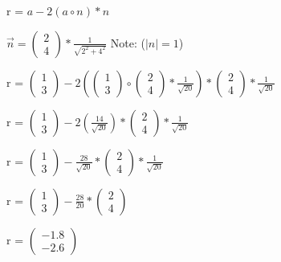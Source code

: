 r = $ a - 2 (a \circ n) * n $

$
\vec{n}
=
\left(\begin{array}{c} 2 \\ 4 \end{array}\right) * \frac{1}{\sqrt{2^2 + 4^2}}
$ Note: ($|n| = 1$)

r = $
\left(\begin{array}{c}1\\3\end{array}\right)
-
2
\left(
    \left(\begin{array}{c}1\\3\end{array}\right)
    \circ
    \left(\begin{array}{c} 2 \\ 4 \end{array}\right) * \frac{1}{\sqrt{20}}
\right)
*
\left(\begin{array}{c} 2 \\ 4 \end{array}\right) * \frac{1}{\sqrt{20}}
$

r = $
\left(\begin{array}{c}1\\3\end{array}\right)
-
2
\left(
    \frac{14}{\sqrt{20}}
\right)
*
\left(\begin{array}{c} 2 \\ 4 \end{array}\right) * \frac{1}{\sqrt{20}}
$

r = $
\left(\begin{array}{c}1\\3\end{array}\right)
-
\frac{28}{\sqrt{20}}
*
\left(\begin{array}{c} 2 \\ 4 \end{array}\right) * \frac{1}{\sqrt{20}}
$

r = $
\left(\begin{array}{c}1\\3\end{array}\right)
-
\frac{28}{20}
*
\left(\begin{array}{c} 2 \\ 4 \end{array}\right)
$

r = $
\left(\begin{array}{c}-1.8\\-2.6\end{array}\right)
$